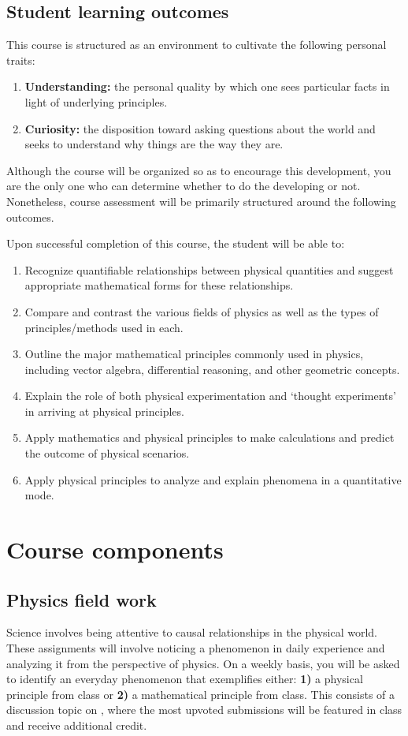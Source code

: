 \documentclass{syllabus}
\begin{document}
\subsection*{Student learning outcomes}

This course is structured as an environment to cultivate the following personal traits:
\begin{enumerate}
    \item \textbf{Understanding:} the personal quality by which one sees particular facts in light of underlying principles.
    \item \textbf{Curiosity:} the disposition toward asking questions about the world and seeks to understand why things are the way they are.
\end{enumerate}
Although the course will be organized so as to encourage this development, you are the only one who can determine whether to do the developing or not. Nonetheless, course assessment will be primarily structured around the following outcomes.


Upon successful completion of this course, the student will be able to:
\begin{enumerate}[label=\textcolor{CarthageDark}{\bfseries\arabic*.}]
    \item Recognize quantifiable relationships between physical quantities and suggest appropriate mathematical forms for these relationships.
    \item Compare and contrast the various fields of physics as well as the types of principles/methods used in each.
    \item Outline the major mathematical principles commonly used in physics, including vector algebra, differential reasoning, and other geometric concepts.
    \item Explain the role of both physical experimentation and `thought experiments' in arriving at physical principles.
    \item Apply mathematics and physical principles to make calculations and predict the outcome of physical scenarios.
    \item Apply physical principles to analyze and explain phenomena in a quantitative mode.
\end{enumerate}

\section*{Course components}
\subsection{Physics field work}
Science involves being attentive to causal relationships in the physical world. These assignments will involve noticing a phenomenon in daily experience and analyzing it from the perspective of physics. On a weekly basis, you will be asked to identify an everyday phenomenon that exemplifies either: \textbf{1)} a physical principle from class or \textbf{2)} a mathematical principle from class. This consists of a discussion topic on \lms, where the most upvoted submissions will be featured in class and receive additional credit.
\end{document}
